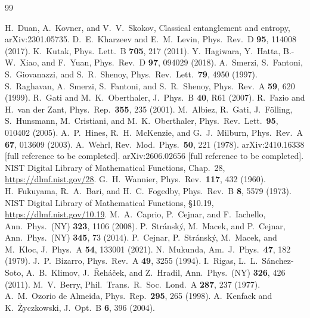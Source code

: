 \documentclass[pra,twocolumn,superscriptaddress,longbibliography,floatfix]{revtex4-2}
\begin{document}
\begin{thebibliography}{99}

 H.~Duan, A.~Kovner, and V.~V.~Skokov, Classical entanglement and
entropy, arXiv:2301.05735.
 D.~E.~Kharzeev and E.~M.~Levin, Phys.\ Rev.\ D
\textbf{95}, 114008 (2017).
 K.~Kutak, Phys.\ Lett.\ B \textbf{705}, 217 (2011).
 Y.~Hagiwara, Y.~Hatta, B.-W.~Xiao, and F.~Yuan, Phys.\ Rev.\ D
\textbf{97}, 094029 (2018).
 A.~Smerzi, S.~Fantoni, S.~Giovanazzi, and S.~R.~Shenoy,
Phys.\ Rev.\ Lett.\ \textbf{79}, 4950 (1997).
 S.~Raghavan, A.~Smerzi, S.~Fantoni, and S.~R.~Shenoy,
Phys.\ Rev.\ A \textbf{59}, 620 (1999).
 R.~Gati and M.~K.~Oberthaler, J.\ Phys.\ B \textbf{40},
R61 (2007).
 R.~Fazio and H.~van der Zant, Phys.\ Rep.\ \textbf{355},
235 (2001).
 M.~Albiez, R.~Gati, J.~F\"olling, S.~Hunsmann, M.~Cristiani,
and M.~K.~Oberthaler, Phys.\ Rev.\ Lett.\ \textbf{95}, 010402 (2005).
 A.~P.~Hines, R.~H.~McKenzie, and G.~J.~Milburn, Phys.\ Rev.\ A
\textbf{67}, 013609 (2003).
 A.~Wehrl, Rev.\ Mod.\ Phys.\ \textbf{50}, 221 (1978).
 arXiv:2410.16338 [full reference to be completed].
 arXiv:2606.02656 [full reference to be completed].
 NIST Digital Library of Mathematical Functions, Chap.~28,
\url{https://dlmf.nist.gov/28}.
 G.~H.~Wannier, Phys.\ Rev.\ \textbf{117}, 432 (1960).
 H.~Fukuyama, R.~A.~Bari, and H.~C.~Fogedby, Phys.\ Rev.\ B
\textbf{8}, 5579 (1973).
 NIST Digital Library of Mathematical Functions, \S10.19,
\url{https://dlmf.nist.gov/10.19}.
 M.~A.~Caprio, P.~Cejnar, and F.~Iachello,
Ann.\ Phys.\ (NY) \textbf{323}, 1106 (2008).
 P.~Str\'ansk\'y, M.~Macek, and P.~Cejnar, Ann.\ Phys.\ (NY)
\textbf{345}, 73 (2014).
 P.~Cejnar, P.~Str\'ansk\'y, M.~Macek, and M.~Kloc, J.\ Phys.\ A
\textbf{54}, 133001 (2021).
 N.~Mukunda, Am.\ J.\ Phys.\ \textbf{47}, 182 (1979).
 J.~P.~Bizarro, Phys.\ Rev.\ A \textbf{49}, 3255 (1994).
 I.~Rigas, L.~L.~S\'anchez-Soto, A.~B.~Klimov,
J.~\v{R}eh\'a\v{c}ek, and Z.~Hradil, Ann.\ Phys.\ (NY) \textbf{326}, 426 (2011).
 M.~V.~Berry, Phil.\ Trans.\ R.\ Soc.\ Lond.\ A \textbf{287},
237 (1977).
 A.~M.~Ozorio de Almeida, Phys.\ Rep.\ \textbf{295}, 265 (1998).
 A.~Kenfack and K.~\.Zyczkowski, J.\ Opt.\ B \textbf{6}, 396 (2004).

\end{thebibliography}
\end{document}
